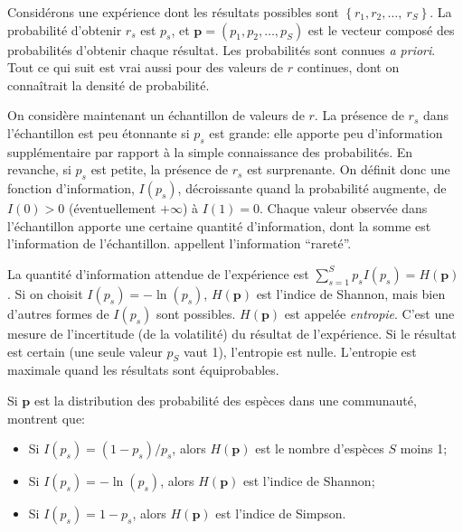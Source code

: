 \documentclass[
  11pt,
  french,
  a4paper,
  extrafontsizes,onecolumn,openright
  ]{memoir}
\providecommand{\tightlist}{%
  \setlength{\itemsep}{0pt}\setlength{\parskip}{0pt}}
\begin{document}
Considérons une expérience dont les résultats possibles sont \(\left\{r_1,r_2,\dots ,\ r_S\right\}\).
La probabilité d'obtenir \(r_s\) est \(p_s\), et \(\mathbf{p}=(p_1,p_2,\dots,p_S)\) est le vecteur composé des probabilités d'obtenir chaque résultat.
Les probabilités sont connues \emph{a priori}.
Tout ce qui suit est vrai aussi pour des valeurs de \(r\) continues, dont on connaîtrait la densité de probabilité.

On considère maintenant un échantillon de valeurs de \(r\).
La présence de \(r_s\) dans l'échantillon est peu étonnante si \(p_s\) est grande: elle apporte peu d'information supplémentaire par rapport à la simple connaissance des probabilités.
En revanche, si \(p_s\) est petite, la présence de \(r_s\) est surprenante.
On définit donc une fonction d'information, \(I(p_s)\), décroissante quand la probabilité augmente, de \(I(0)>0\) (éventuellement \(+\infty\)) à \(I(1)=0\).
Chaque valeur observée dans l'échantillon apporte une certaine quantité d'information, dont la somme est l'information de l'échantillon.
\textcite{Patil1982} appellent l'information \enquote{rareté}.

La quantité d'information attendue de l'expérience est \(\sum^S_{s=1}{p_s I(p_s) = H(\mathbf{p})}\).
Si on choisit \(I\left(p_s\right)=-\ln\left(p_s\right)\), \(H\left(\mathbf{p}\right)\) est l'indice de Shannon, mais bien d'autres formes de \(I\left(p_s\right)\) sont possibles.
\(H\left(\mathbf{p}\right)\) est appelée \emph{entropie}.
C'est une mesure de l'incertitude (de la volatilité) du résultat de l'expérience.
Si le résultat est certain (une seule valeur \(p_S\) vaut 1), l'entropie est nulle.
L'entropie est maximale quand les résultats sont équiprobables.

Si \(\mathbf{p}\) est la distribution des probabilité des espèces dans une communauté, \textcite{Patil1982} montrent que:

\begin{itemize}
\tightlist
\item
  Si \(I\left(p_s\right) = (1-p_s)/{p_s}\), alors \(H\left(\mathbf{p}\right)\) est le nombre d'espèces \(S\) moins 1;
\item
  Si \(I\left(p_s\right)=-\ln\left(p_s\right)\), alors \(H\left(\mathbf{p}\right)\) est l'indice de Shannon;
\item
  Si \(I\left(p_s\right)=1-p_s\), alors \(H\left(\mathbf{p}\right)\) est l'indice de Simpson.
\end{itemize}
\end{document}
